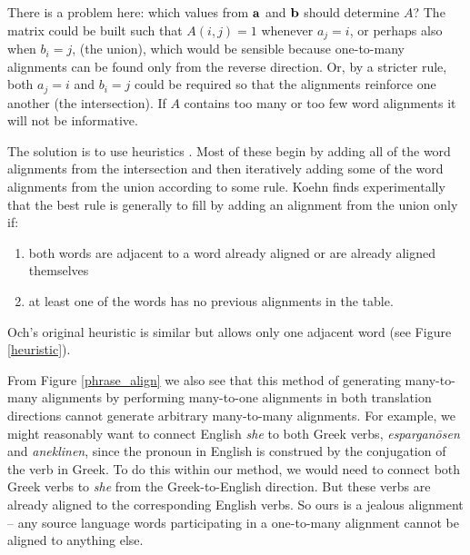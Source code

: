 \documentclass[11pt]{article}
\begin{document}
There is a problem here: which values from $\aa$ and $\bb$ should determine $A$?
The matrix could be built such that $A(i,j) = 1$ whenever $a_j = i$, or perhaps also when $b_i = j$, (the union), which
would be sensible because one-to-many alignments can be found only from the reverse direction.
Or, by a stricter rule, both $a_j = i$ and $b_i = j$ could be required so that the alignments reinforce one another (the intersection).
If $A$ contains too many or too few word alignments it will not be informative.

The solution is to use heuristics \cite{och:99, koehn:03}.
Most of these begin by adding all of the word alignments from the intersection
and then iteratively adding some of the word alignments from the union according to some rule. 
Koehn \cite{koehn:03} finds experimentally that the best rule is generally to fill by adding an alignment
from the union only if:

\begin{enumerate}
\item both words are adjacent to a word already aligned or are already aligned themselves
\item at least one of the words has no previous alignments in the table.
\end{enumerate}

Och's original heuristic is similar but allows only one adjacent word \cite{och:99, och:00, och:04} (see Figure \ref{heuristic}). 

From Figure \ref{phrase_align} we also see that this method of generating many-to-many alignments by performing many-to-one alignments
in both translation directions cannot generate arbitrary many-to-many alignments.
For example, we might reasonably want to connect English \textit{she} to both Greek verbs, \textit{espargan\={o}sen} and \textit{aneklinen},
since the pronoun in English is construed by the conjugation of the verb in Greek.
To do this within our method, we would need to connect both Greek verbs to \textit{she} from the Greek-to-English direction.
But these verbs are already aligned to the corresponding English verbs.
So ours is a jealous alignment -- any source language words participating in a one-to-many alignment cannot be aligned to
anything else.
\end{document}
